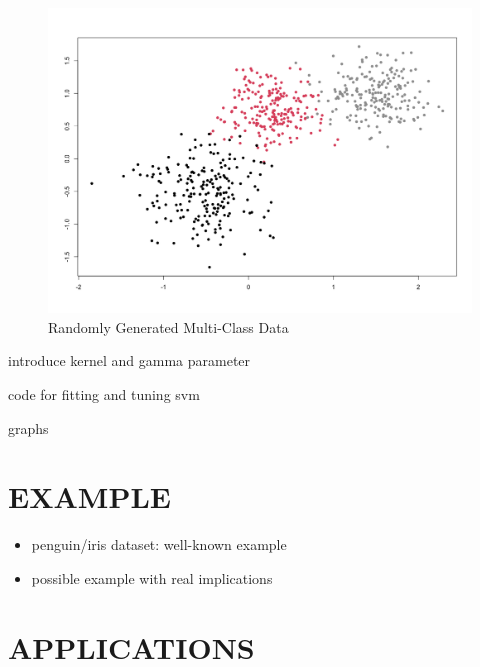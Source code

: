 \documentclass[12pt]{article}
\begin{document}
\begin{figure}[ht]
    \centering
    \includegraphics[width=5in]{Figures/svm_randomly_generated_data.png}
    \caption{Randomly Generated Multi-Class Data}
    \label{fig_svm_randomly_generated_data}
\end{figure}

introduce kernel and gamma parameter

code for fitting and tuning svm

graphs

\section{EXAMPLE}
\begin{itemize}
    \item penguin/iris dataset: well-known example
    \item possible example with real implications
\end{itemize}

\section{APPLICATIONS}
\end{document}
